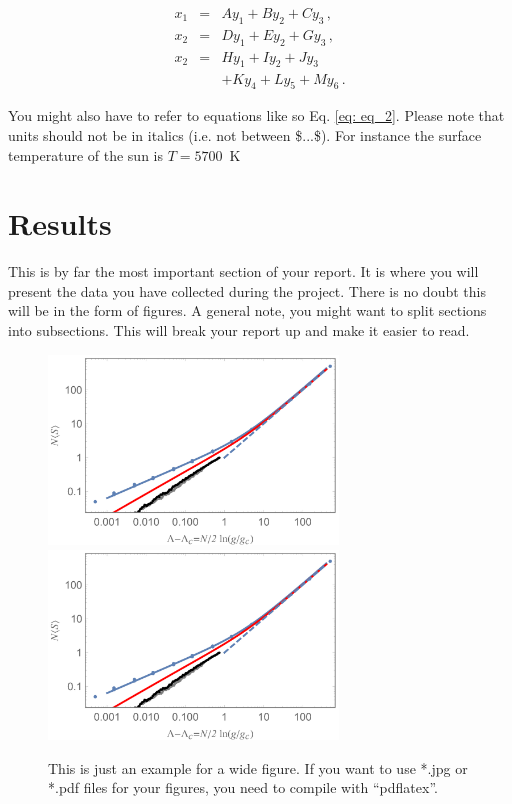 \documentclass[a4paper, twocolumn, 12pt, notitlepage]{revtex4-1}
\begin{document}
\begin{eqnarray}
x_1 &=& A y_1 + B y_2 + C y_3    \,, \\
x_2 &=& D y_1 + E y_2 + G y_3    \,, \\ 
x_2 &=& H y_1 + I y_2 + J y_3    \nonumber\\
    &~& + K y_4 + L y_5 + M y_6  \,. 
\label{eq: eq_2}
\end{eqnarray}

You might also have to refer to equations like so Eq. \eqref{eq: eq_2}. Please note that units should not be in italics (i.e. not between \$...\$). For instance the surface temperature of the sun is $T = 5700$~K


\section{Results}
This is by far the most important section of your report. It is where you will present the data you have collected during the project. There is no doubt this will be in the form of figures. A general note, you might want to split sections into subsections. This will break your report up and make it easier to read.

\begin{figure}[t]
\centering
\includegraphics[width=77mm]{pngexample.png} \hspace{3mm}
\includegraphics[width=77mm]{pngexample.png}
\caption{\small This is just an example for a wide figure.
                If you want to use *.jpg or *.pdf files
                for your figures, you need to compile with
                ``pdflatex''.}
\label{fig: fig_2}
\end{figure}
\end{document}
